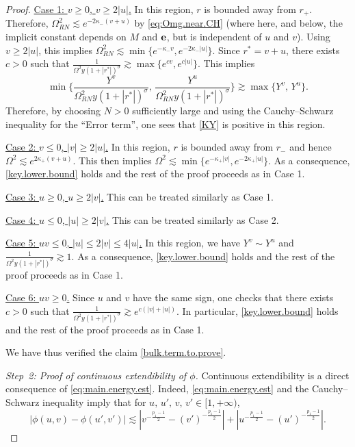 \documentclass[10pt, reqno]{amsart}
\theoremstyle{definition}
\theoremstyle{remark}
\numberwithin{equation}{section}
\def\ls{\lesssim}
\newcommand{\0}{\emptyset}
\newcommand{\Omg}{\Omega}
\newcommand{\f}{\frac}
\newcommand{\pfstep}[1]{\vspace{.5em} {\it #1.}}
\begin{document}
\begin{proof}
\underline{Case 1: $v\geq 0$, $v\geq 2|u|$.} In this region, $r$ is bounded away from $r_+$. Therefore, $\Omg_{RN}^2\lesssim e^{-2\kappa_-(v+u)}$ by \eqref{eq:Omg.near.CH} (where here, and below, the implicit constant depends on $M$ and ${\bf e}$, but is independent of $u$ and $v$). Using $v\geq 2|u|$, this implies $\Omg_{RN}^2\lesssim \min\{e^{-\kappa_- v},e^{-2\kappa_- |u|}\}$. Since $r^*=v+u$, there exists $c>0$ such that $\f 1{\Omg^2 y (1+|r^*|)^{\sigma}}\gtrsim \max\{e^{cv},e^{c|u|}\}$. This implies 
\begin{equation}\label{key.lower.bound}
\min\{\f {Y^v}{\Omg_{RN}^2 y (1+|r^*|)^{\sigma}},\, \f {Y^u}{\Omg_{RN}^2 y (1+|r^*|)^{\sigma}} \}\gtrsim\max\{Y^v, \, Y^u\}.
\end{equation}
Therefore, by choosing $N>0$ sufficiently large and using the Cauchy--Schwarz inequality for the ``Error term'', one sees that \eqref{KY} is positive in this region.

\underline{Case 2: $v\leq 0$, $|v|\geq 2|u|$.} In this region, $r$ is bounded away from $r_-$ and hence $\Omg^2\lesssim e^{2\kappa_+(v+u)}$. This then implies $\Omg^2\lesssim \min\{e^{-\kappa_+ |v|},e^{-2\kappa_+|u|}\}$. As a consequence, \eqref{key.lower.bound} holds and the rest of the proof proceeds as in Case 1.

\underline{Case 3: $u\geq 0$, $u\geq 2|v|$.} This can be treated similarly as Case 1. 

\underline{Case 4: $u\leq 0$, $|u|\geq 2|v|$.} This can be treated similarly as Case 2. 

\underline{Case 5: $uv\leq 0$, $|u|\leq 2|v|\leq 4|u|$.} In this region, we have $Y^v\sim Y^u$ and $\f 1{\Omg^2 y (1+|r^*|)^{\sigma}}\gtrsim 1$. As a consequence, \eqref{key.lower.bound} holds and the rest of the proof proceeds as in Case 1.

\underline{Case 6: $uv\geq 0$.} Since $u$ and $v$ have the same sign, one checks that there exists $c>0$ such that $\f 1{\Omg^2 y (1+|r^*|)^{\sigma}}\gtrsim e^{c(|v|+|u|)}$. In particular, \eqref{key.lower.bound} holds and the rest of the proof proceeds as in Case 1.

We have thus verified the claim \eqref{bulk.term.to.prove}.

\pfstep{Step~2: Proof of continuous extendibility of $\phi$} Continuous extendibility is a direct consequence of \eqref{eq:main.energy.est}. Indeed, \eqref{eq:main.energy.est} and the Cauchy--Schwarz inequality imply that for $u,\,u',\,v,\,v'\in [ 1, +\infty)$,
\begin{equation}\label{eq:phi.Cauchy}
|\phi(u,v) - \phi(u',v')| \ls |v^{-\f{p_1-1}{2}} - (v')^{-\f{p_1-1}{2}} | + | u^{-\f{p_1-1}{2}} - (u')^{-\f{p_1-1}{2}}|.
\end{equation}



\end{proof}
\end{document}

